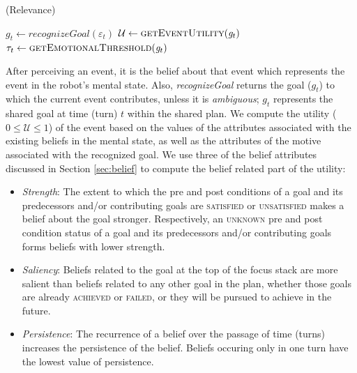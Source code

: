 \documentclass{aamas2016}
\begin{document}
\vspace*{-2mm}
\begin{algorithm}
	\caption{(Relevance)}
	\label{alg:relevance}
	\begin{algorithmic}[1]
			\Statex
			\State $\mathit{g}_{t} \gets \textit{recognizeGoal}{(\varepsilon_t)}$
			\Statex
			\State $\mathcal{U} \gets \Call{getEventUtility}{\mathit{g}_{t}}$ 
			\State $\tau_{t} \gets \Call{getEmotionalThreshold}{\mathit{g}_{t}}$
			\Statex
				\State {}
			\Else
				\State {}
			\EndIf
		\EndFunction
	\end{algorithmic}
\end{algorithm}

\vspace*{-3mm}
After perceiving an event, it is the belief about that event which represents
the event in the robot's mental state. Also, \textit{recognizeGoal} returns
the goal ($g_{t}$) to which the current event contributes, unless it is
\textit{ambiguous}; $g_{t}$ represents the shared goal at time (turn) $t$ within
the shared plan. We compute the utility ($0 \leq \mathcal{U} \leq 1$) of the
event based on the values of the attributes associated with the existing beliefs
in the mental state, as well as the attributes of the motive associated with the
recognized goal. We use three of the belief attributes discussed in Section
\ref{sec:belief} to compute the belief related part of the utility: 

\vspace*{-2mm}
\begin{itemize}[leftmargin=2pt]
  \setlength\itemsep{0.2mm}
  \item \textit{Strength}: The extent to which the pre and post conditions of a
  goal and its predecessors and/or contributing goals are \textsc{satisfied} or
  \textsc{unsatisfied} makes a belief about the goal stronger.
  Respectively, an \textsc{unknown} pre and post condition status of a goal and
  its predecessors and/or contributing goals forms beliefs with lower strength.
  \item \textit{Saliency}: Beliefs related to the goal at the top of the focus
  stack are more salient than beliefs related to any other goal in the plan,
  whether those goals are already \textsc{achieved} or \textsc{failed}, or they
  will be pursued to achieve in the future.
  \item \textit{Persistence}: The recurrence of a belief over the passage of
  time (turns) increases the persistence of the belief. Beliefs occuring only in
  one turn have the lowest value of persistence.
\end{itemize}
\end{document}
